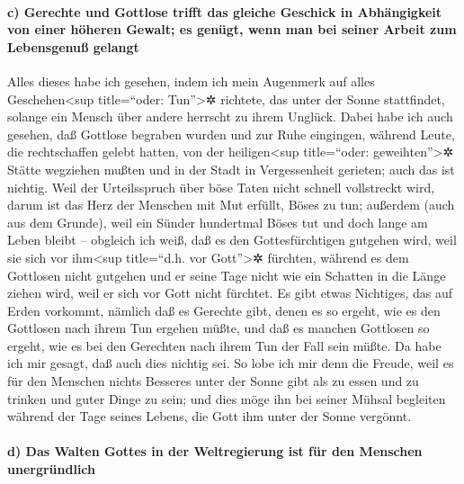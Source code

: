 \hypertarget{c-gerechte-und-gottlose-trifft-das-gleiche-geschick-in-abhuxe4ngigkeit-von-einer-huxf6heren-gewalt-es-genuxfcgt-wenn-man-bei-seiner-arbeit-zum-lebensgenuuxdf-gelangt}{%
\paragraph{c) Gerechte und Gottlose trifft das gleiche Geschick in
Abhängigkeit von einer höheren Gewalt; es genügt, wenn man bei seiner
Arbeit zum Lebensgenuß
gelangt}\label{c-gerechte-und-gottlose-trifft-das-gleiche-geschick-in-abhuxe4ngigkeit-von-einer-huxf6heren-gewalt-es-genuxfcgt-wenn-man-bei-seiner-arbeit-zum-lebensgenuuxdf-gelangt}}

Alles dieses habe ich gesehen, indem ich mein Augenmerk
auf alles Geschehen\textless sup title=``oder: Tun''\textgreater✲
richtete, das unter der Sonne stattfindet, solange ein Mensch über
andere herrscht zu ihrem Unglück. Dabei habe ich auch
gesehen, daß Gottlose begraben wurden und zur Ruhe eingingen, während
Leute, die rechtschaffen gelebt hatten, von der heiligen\textless sup
title=``oder: geweihten''\textgreater✲ Stätte wegziehen mußten und in
der Stadt in Vergessenheit gerieten; auch das ist nichtig.
Weil der Urteilsspruch über böse Taten nicht schnell
vollstreckt wird, darum ist das Herz der Menschen mit Mut erfüllt, Böses
zu tun; außerdem (auch aus dem Grunde), weil ein Sünder
hundertmal Böses tut und doch lange am Leben bleibt -- obgleich ich
weiß, daß es den Gottesfürchtigen gutgehen wird, weil sie sich vor
ihm\textless sup title=``d.h. vor Gott''\textgreater✲ fürchten,
während es dem Gottlosen nicht gutgehen und er seine Tage
nicht wie ein Schatten in die Länge ziehen wird, weil er sich vor Gott
nicht fürchtet. Es gibt etwas Nichtiges, das auf Erden
vorkommt, nämlich daß es Gerechte gibt, denen es so ergeht, wie es den
Gottlosen nach ihrem Tun ergehen müßte, und daß es manchen Gottlosen so
ergeht, wie es bei den Gerechten nach ihrem Tun der Fall sein müßte. Da
habe ich mir gesagt, daß auch dies nichtig sei. So lobe
ich mir denn die Freude, weil es für den Menschen nichts Besseres unter
der Sonne gibt als zu essen und zu trinken und guter Dinge zu sein; und
dies möge ihn bei seiner Mühsal begleiten während der Tage seines
Lebens, die Gott ihm unter der Sonne vergönnt.

\hypertarget{d-das-walten-gottes-in-der-weltregierung-ist-fuxfcr-den-menschen-unergruxfcndlich}{%
\paragraph{d) Das Walten Gottes in der Weltregierung ist für den
Menschen
unergründlich}\label{d-das-walten-gottes-in-der-weltregierung-ist-fuxfcr-den-menschen-unergruxfcndlich}}


